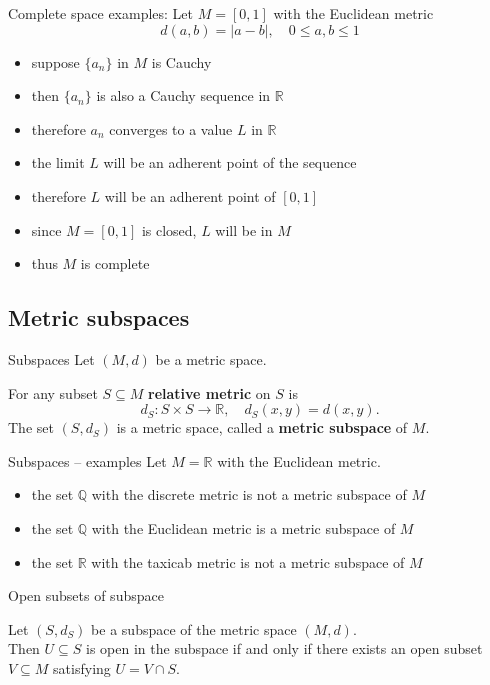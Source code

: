 \documentclass{beamer}
\begin{document}
\begin{frame}{Complete space examples:}
Let $M= [0, 1]$ with the Euclidean metric
$$d(a,b) = |a-b|,\quad 0\leq a,b\leq 1$$
\begin{itemize}
\pause
\pause
  \item suppose $\{a_n\}$ in $M$ is Cauchy
\pause
  \item then $\{a_n\}$ is also a Cauchy sequence in $\mathbb R$
\pause
  \item therefore $a_n$ converges to a value $L$ in $\mathbb R$
\pause
  \item the limit $L$ will be an adherent point of the sequence
\pause
  \item therefore $L$ will be an adherent point of $[0,1]$
\pause
  \item since $M = [0,1]$ is closed, $L$ will be in $M$
\pause
  \item thus $M$ is complete
\end{itemize}
\end{frame}

\subsection{Metric subspaces}

\begin{frame}{Subspaces}
Let $(M,d)$ be a metric space.
\begin{defn}
\pause
For any subset $S\subseteq M$ \textbf{relative metric} on $S$ is
\pause
$$d_S: S\times S\rightarrow\mathbb R,\quad d_S(x,y) = d(x,y).$$
\pause
The set $(S,d_S)$ is a metric space, called a \textbf{metric subspace} of $M$.
\end{defn}
\end{frame}

\begin{frame}{Subspaces -- examples}
Let $M=\mathbb R$ with the Euclidean metric.\\
\begin{itemize}
\pause
\item the set $\mathbb Q$ with the discrete metric is not a metric subspace of $M$
\pause
\item the set $\mathbb Q$ with the Euclidean metric is a metric subspace of $M$
\pause
\item the set $\mathbb R$ with the taxicab metric is not a metric subspace of $M$
\end{itemize}
\end{frame}

\begin{frame}{Open subsets of subspace}
\begin{thm}
Let $(S,d_S)$ be a subspace of the metric space $(M,d)$.\\
Then $U\subseteq S$ is open in the subspace if and only if there exists an open subset $V\subseteq M$ satisfying $U=V\cap S$.
\end{thm}
\end{frame}
\end{document}
